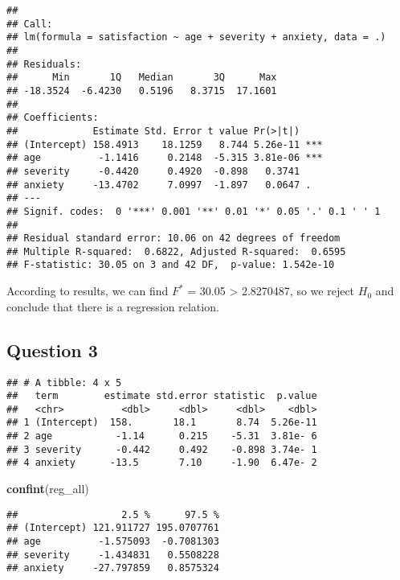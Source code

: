 \documentclass[]{article}
\newenvironment{Shaded}{\begin{snugshade}}{\end{snugshade}}
\newcommand{\KeywordTok}[1]{\textcolor[rgb]{0.13,0.29,0.53}{\textbf{#1}}}
\newcommand{\StringTok}[1]{\textcolor[rgb]{0.31,0.60,0.02}{#1}}
\newcommand{\OperatorTok}[1]{\textcolor[rgb]{0.81,0.36,0.00}{\textbf{#1}}}
\newcommand{\NormalTok}[1]{#1}
\begin{document}
\begin{verbatim}
## 
## Call:
## lm(formula = satisfaction ~ age + severity + anxiety, data = .)
## 
## Residuals:
##      Min       1Q   Median       3Q      Max 
## -18.3524  -6.4230   0.5196   8.3715  17.1601 
## 
## Coefficients:
##             Estimate Std. Error t value Pr(>|t|)    
## (Intercept) 158.4913    18.1259   8.744 5.26e-11 ***
## age          -1.1416     0.2148  -5.315 3.81e-06 ***
## severity     -0.4420     0.4920  -0.898   0.3741    
## anxiety     -13.4702     7.0997  -1.897   0.0647 .  
## ---
## Signif. codes:  0 '***' 0.001 '**' 0.01 '*' 0.05 '.' 0.1 ' ' 1
## 
## Residual standard error: 10.06 on 42 degrees of freedom
## Multiple R-squared:  0.6822, Adjusted R-squared:  0.6595 
## F-statistic: 30.05 on 3 and 42 DF,  p-value: 1.542e-10
\end{verbatim}

According to results, we can find \(F^*\) = 30.05 \textgreater{}
2.8270487, so we reject \(H_0\) and conclude that there is a regression
relation.

\subsection{Question 3}\label{question-3-1}

\begin{Shaded}
\end{Shaded}

\begin{verbatim}
## # A tibble: 4 x 5
##   term        estimate std.error statistic  p.value
##   <chr>          <dbl>     <dbl>     <dbl>    <dbl>
## 1 (Intercept)  158.       18.1       8.74  5.26e-11
## 2 age           -1.14      0.215    -5.31  3.81e- 6
## 3 severity      -0.442     0.492    -0.898 3.74e- 1
## 4 anxiety      -13.5       7.10     -1.90  6.47e- 2
\end{verbatim}

\begin{Shaded}
\begin{Highlighting}[]
\KeywordTok{confint}\NormalTok{(reg_all)}
\end{Highlighting}
\end{Shaded}

\begin{verbatim}
##                  2.5 %      97.5 %
## (Intercept) 121.911727 195.0707761
## age          -1.575093  -0.7081303
## severity     -1.434831   0.5508228
## anxiety     -27.797859   0.8575324
\end{verbatim}
\end{document}
